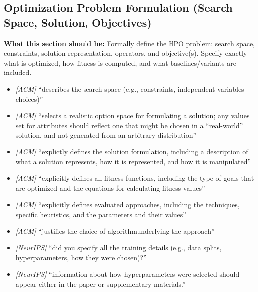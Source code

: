 \documentclass[11pt]{article}
\begin{document}
\subsection{Optimization Problem Formulation (Search Space, Solution, Objectives)}
\noindent\textbf{What this section should be:}
Formally define the HPO problem: search space, constraints, solution representation, operators, and objective(s). Specify exactly what is optimized, how fitness is computed, and what baselines/variants are included.
\begin{itemize}
  \item \textit{[ACM]} ``describes the search space (e.g., constraints, independent variables choices)''
  \item \textit{[ACM]} ``selects a realistic option space for formulating a solution; any values set for attributes should reflect one that might be chosen in a ``real-world'' solution, and not generated from an arbitrary distribution''
  \item \textit{[ACM]} ``explictly defines the solution formulation, including a description of what a solution represents, how it is represented, and how it is manipulated''
  \item \textit{[ACM]} ``explicitly defines all fitness functions, including the type of goals that are optimized and the equations for calculating fitness values''
  \item \textit{[ACM]} ``explicitly defines evaluated approaches, including the techniques, specific heuristics, and the parameters and their values''
  \item \textit{[ACM]} ``justifies the choice of algorithmunderlying the approach''
  \item \textit{[NeurIPS]} ``did you specify all the training details (e.g., data splits, hyperparameters, how they were chosen)?''
  \item \textit{[NeurIPS]} ``information about how hyperparameters were selected should appear either in the paper or supplementary materials.''
\end{itemize}
\end{document}
